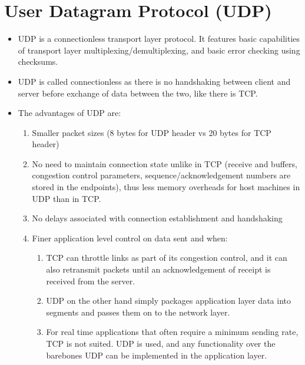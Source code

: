 \documentclass{article}
\theoremstyle{plain}
\theoremstyle{definition}
\begin{document}
\section{User Datagram Protocol (UDP)}
\begin{itemize}
    \item UDP is a connectionless transport layer protocol. It features basic capabilities of transport layer multiplexing/demultiplexing, and basic error checking using checksums.
    
    \item UDP is called connectionless as there is no handshaking between client and server before exchange of data between the two, like there is TCP. 
    
    \item The advantages of UDP are:
    \begin{enumerate}
        \item Smaller packet sizes (8 bytes for UDP header vs 20 bytes for TCP header)
        
        \item No need to maintain connection state unlike in TCP (receive and buffers, congestion control parameters, sequence/acknowledgement numbers are stored in the endpoints), thus less memory overheads for host machines in UDP than in TCP.
        
        \item No delays associated with connection establishment and handshaking
        
        \item Finer application level control on data sent and when:
        \begin{enumerate}
            \item TCP can throttle links as part of its congestion control, and it can also retransmit packets until an acknowledgement of receipt is received from the server. 
            
            \item UDP on the other hand simply packages application layer data into segments and passes them on to the network layer. 
            
            \item For real time applications that often require a minimum sending rate, TCP is not suited. UDP is used, and any functionality over the barebones UDP can be implemented in the application layer. 
        \end{enumerate}
    \end{enumerate}
\end{itemize}
\end{document}
